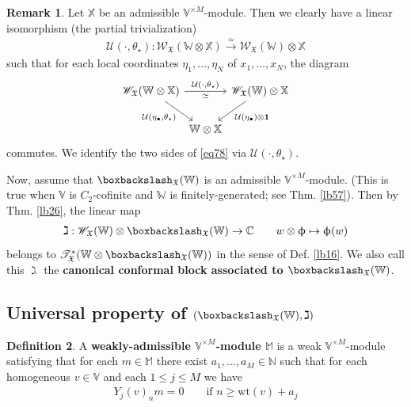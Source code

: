 \documentclass[11pt,b5paper,notitlepage]{article}
\theoremstyle{definition}
\newtheorem{df}{Definition}[section]
\newtheorem{rem}[df]{Remark}
\theoremstyle{plain}
\newcommand{\fk}{\mathfrak}
\newcommand{\mc}{\mathcal}
\newcommand{\idt}{\mathbf{1}}
\newcommand{\scr}{\mathscr}
\newcommand{\blt}{\bullet}
\newcommand{\Vbb}{\mathbb V}
\newcommand{\Xbb}{\mathbb X}
\newcommand{\Wbb}{\mathbb W}
\newcommand{\Mbb}{\mathbb M}
\newcommand{\Cbb}{\mathbb C}
\newcommand{\Nbb}{\mathbb N}
\newcommand{\wt}{\mathrm{wt}}
\newcommand{\<}{\left\langle}
\renewcommand{\>}{\right\rangle}
\newcommand{\fx}{\mathfrak{X}}
\newcommand{\bbs}{\boxbackslash}
\numberwithin{equation}{section}
\begin{document}
\begin{rem}\label{lb56}
Let $\Xbb$ be an admissible $\Vbb^{\times M}$-module. Then we clearly have a linear isomorphism (the partial trivialization)
\begin{align}\label{eq78}
\mc U(\cdot,\theta_\star):\scr W_{\fk X}(\Wbb\otimes \Xbb)\xrightarrow{\simeq}\scr W_\fx(\Wbb)\otimes \Xbb
\end{align}
such that for each local coordinates $\eta_1,\dots,\eta_N$ of $x_1,\dots,x_N$, the diagram
\begin{equation}\label{eq128}
\begin{tikzcd}[column sep=0ex]
\scr W_{\fk X}(\Wbb\otimes \Xbb) \arrow[rr,"\simeq"',"{\mc U(\cdot,\theta_\star)}"] \arrow[rd,"{\mc U(\eta_\blt,\theta_\star)}"'] &   & \scr W_\fx(\Wbb)\otimes \Xbb \arrow[ld,"\mc U(\eta_\blt)\otimes\idt"] \\
                        & \Wbb\otimes\Xbb &             
\end{tikzcd}
\end{equation}
commutes. We identify the two sides of \eqref{eq78} via $\mc U(\cdot,\theta_\star)$.

Now, assume that $\bbs_\fx(\Wbb)$ is an admissible $\Vbb^{\times M}$-module. (This is true when $\Vbb$ is $C_2$-cofinite and $\Wbb$ is finitely-generated; see Thm. \ref{lb57}). Then by Thm. \ref{lb26}, the linear map
\begin{align}
\gimel:\scr W_\fx(\Wbb)\otimes \boxbackslash_\fx(\Wbb)\rightarrow \Cbb\qquad
        w\otimes \upphi\mapsto \upphi(w)
\end{align}
belongs to $\scr T_{\fk X}^*(\Wbb\otimes\bbs_\fx(\Wbb))$ in the sense of Def. \ref{lb16}. We also call this $\gimel$ the \textbf{canonical conformal block associated to $\bbs_\fx(\Wbb)$}.
\end{rem}


\subsection{Universal property of $(\bbs_\fx(\Wbb),\gimel)$}



\begin{df}
A \textbf{weakly-admissible $\Vbb^{\times M}$-module $\Mbb$}  is a weak $\Vbb^{\times M}$-module satisfying that for each $m\in\Mbb$  there exist $a_1,\dots,a_M\in\Nbb$ such that for each homogeneous $v\in\Vbb$ and each $1\leq j\leq M$ we have
\begin{align}
Y_j(v)_n m=0 \qquad \text{if } n\geq \wt(v)+a_j  \label{eq118}
\end{align}
\end{df}
\end{document}
